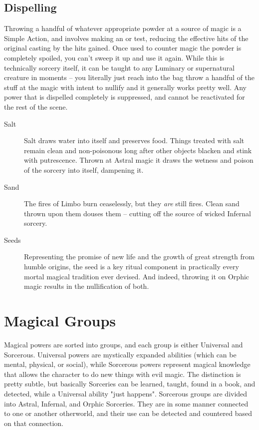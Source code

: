 \subsection{Dispelling} 

\hspace{\parindent} Throwing a handful of whatever appropriate powder at a source of magic is a Simple Action, and involves making an  or  test, reducing the effective hits of the original casting by the hits gained. Once used to counter magic the powder is completely spoiled, you can't sweep it up and use it again. While this is technically sorcery itself, it can be taught to any Luminary or supernatural creature in moments -- you literally just reach into the bag throw a handful of the stuff at the magic with intent to nullify and it generally works pretty well. Any power that is dispelled completely is suppressed, and cannot be reactivated for the rest of the scene.

\begin{description}
\item[Salt] Salt draws water into itself and preserves food. Things treated with salt remain clean and non-poisonous long after other objects blacken and stink with putrescence. Thrown at Astral magic it draws the wetness and poison of the sorcery into itself, dampening it.

\item[Sand] The fires of Limbo burn ceaselessly, but they \textit{are} still fires. Clean sand thrown upon them douses them -- cutting off the source of wicked Infernal sorcery.

\item[Seeds] Representing the promise of new life and the growth of great strength from humble origins, the seed is a key ritual component in practically every mortal magical tradition ever devised. And indeed, throwing it on Orphic magic results in the nullification of both.
\end{description}

\section{Magical Groups}

\hspace{\parindent} Magical powers are sorted into groups, and each group is either Universal and Sorcerous. Universal powers are mystically expanded abilities (which can be mental, physical, or social), while Sorcerous powers represent magical knowledge that allows the character to do new things with evil magic. The distinction is pretty subtle, but basically Sorceries can be learned, taught, found in a book, and detected, while a Universal ability "just happens". Sorcerous groups are divided into Astral, Infernal, and Orphic Sorceries. They are in some manner connected to one or another otherworld, and their use can be detected and countered based on that connection.

